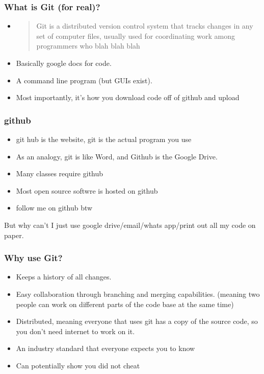 \documentclass[aspectratio=169,hyperref={unicode}]{beamer}
\begin{document}
\begin{frame}
\frametitle{What is Git (for real)?}
\begin{itemize}
\item

\begin{quote}
Git  is a distributed version control system that tracks changes in any set of computer files, usually used for coordinating work among programmers who blah blah blah
\end{quote}
\item Basically google docs for code.
\item A command line program (but GUIs exist).
\item Most importantly, it's how you download code off of github and upload
\end{itemize}
\end{frame}

\begin{frame}
\frametitle{github}
\begin{itemize}
  \item git hub is the website, git is the actual program you use
        \item As an analogy, git is like Word, and Github is the Google Drive.
        \item Many classes require github
        \item Most open source softwre is hosted on github
        \item follow me on github btw
\end{itemize}
\end{frame}

\begin{frame}
But why can't I just use google drive/email/whats app/print out all my code on paper.
\end{frame}

\begin{frame}
\frametitle{Why use Git?}
\begin{itemize}
\item Keeps a history of all changes.
\item Easy collaboration through branching and merging capabilities. (meaning two people can work on different parts of the code base at the same time)
\item Distributed, meaning everyone that uses git has a copy of the source code, so you don't need internet to work on it.
        \item An industry standard that everyone expects you to know
        \item Can potentially show you did not cheat
\end{itemize}
\end{frame}
\end{document}
